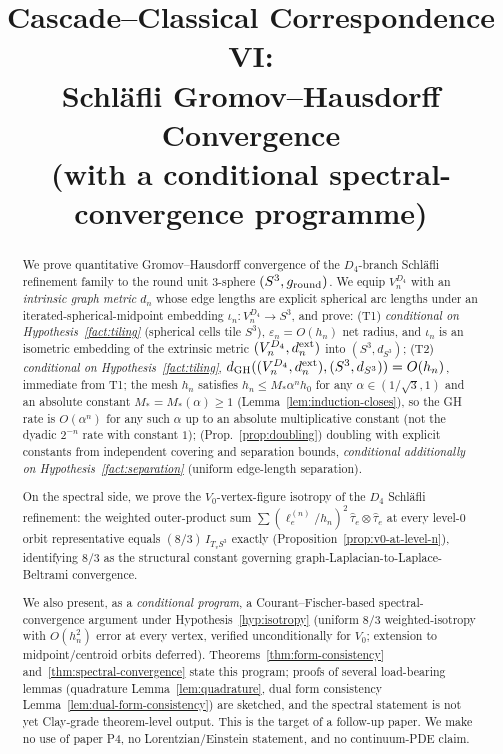 \documentclass[11pt, a4paper]{amsart}
\title{Cascade--Classical Correspondence VI:\\
  Schl\"{a}fli Gromov--Hausdorff Convergence\\
  (with a conditional spectral-convergence programme)}
\author{}
\date{}
\theoremstyle{definition}
\newcommand{\dGH}{d_{\mathrm{GH}}}
\newcommand{\dsph}{d_{S^3}}
\begin{document}
\maketitle

\begin{abstract}
We prove quantitative Gromov--Hausdorff convergence of the
$D_4$-branch Schl\"{a}fli refinement family
\cite{RefinementSpaces} to the round unit $3$-sphere
$(S^3, g_{\rm round})$. We equip $V_n^{D_4}$ with an
\emph{intrinsic graph metric} $d_n$ whose edge lengths are
explicit spherical arc lengths under an iterated-spherical-midpoint
embedding $\iota_n \colon V_n^{D_4} \to S^3$, and prove:
(T1) \emph{conditional on Hypothesis~\ref{fact:tiling}} (spherical
cells tile $S^3$), $\varepsilon_n = O(h_n)$ net radius, and
$\iota_n$ is an isometric embedding of the extrinsic metric
$(V_n^{D_4}, d_n^{\rm ext})$ into $(S^3, \dsph)$;
(T2) \emph{conditional on Hypothesis~\ref{fact:tiling}},
$\dGH((V_n^{D_4}, d_n^{\rm ext}), (S^3, \dsph)) = O(h_n)$, immediate
from T1; the mesh $h_n$ satisfies $h_n \leq M_\ast \alpha^n h_0$
for any $\alpha \in (1/\sqrt{3}, 1)$ and an absolute constant
$M_\ast = M_\ast(\alpha) \geq 1$
(Lemma~\ref{lem:induction-closes}), so the GH rate is $O(\alpha^n)$
for any such $\alpha$ up to an absolute multiplicative constant
(not the dyadic $2^{-n}$ rate with constant $1$);
(Prop.~\ref{prop:doubling}) doubling with explicit constants
from independent covering and separation bounds,
\emph{conditional additionally on Hypothesis~\ref{fact:separation}}
(uniform edge-length separation).

On the spectral side, we prove the $V_0$-vertex-figure isotropy
of the $D_4$ Schl\"{a}fli refinement: the weighted outer-product
sum $\sum (\ell_e^{(n)}/h_n)^2\,\widehat\tau_e \otimes
\widehat\tau_e$ at every level-$0$ orbit representative equals
$(8/3)\,I_{T_v S^3}$ exactly
(Proposition~\ref{prop:v0-at-level-n}), identifying $8/3$ as the
structural constant governing graph-Laplacian-to-Laplace-Beltrami
convergence.

We also present, as a \emph{conditional program}, a
Courant--Fischer-based spectral-convergence argument under
Hypothesis~\ref{hyp:isotropy} (uniform $8/3$ weighted-isotropy
with $O(h_n^2)$ error at every vertex, verified unconditionally
for $V_0$; extension to midpoint/centroid orbits deferred).
Theorems~\ref{thm:form-consistency}
and~\ref{thm:spectral-convergence} state this program; proofs
of several load-bearing lemmas (quadrature
Lemma~\ref{lem:quadrature}, dual form consistency
Lemma~\ref{lem:dual-form-consistency}) are sketched, and the
spectral statement is not yet Clay-grade theorem-level output.
This is the target of a follow-up paper.
We make no use of paper P4, no Lorentzian/Einstein statement, and
no continuum-PDE claim.
\end{abstract}
\end{document}
